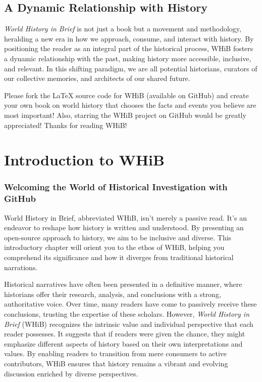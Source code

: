 \documentclass[a4paper,12pt]{book}
\begin{document}
\section*{A Dynamic Relationship with History}
\emph{World History in Brief} is not just a book but a movement and methodology, heralding a new era in how we approach, consume, and interact with history. By positioning the reader as an integral part of the historical process, WHiB fosters a dynamic relationship with the past, making history more accessible, inclusive, and relevant. In this shifting paradigm, we are all potential historians, curators of our collective memories, and architects of our shared future.

Please fork the LaTeX source code for WHiB (available on GitHub) and create your own book on world history that chooses the facts and events you believe are most important! Also, starring the WHiB project on GitHub would be greatly appreciated! Thanks for reading WHiB!

\chapter{Introduction to WHiB}
\subsection*{Welcoming the World of Historical Investigation with GitHub}
World History in Brief, abbreviated WHiB, isn't merely a passive read. It's an endeavor to reshape how history is written and understood. By presenting an open-source approach to history, we aim to be inclusive and diverse. This introductory chapter will orient you to the ethos of WHiB, helping you comprehend its significance and how it diverges from traditional historical narrations.

Historical narratives have often been presented in a definitive manner, where historians offer their research, analysis, and conclusions with a strong, authoritative voice. Over time, many readers have come to passively receive these conclusions, trusting the expertise of these scholars. However, \emph{World History in Brief} (WHiB) recognizes the intrinsic value and individual perspective that each reader possesses. It suggests that if readers were given the chance, they might emphasize different aspects of history based on their own interpretations and values. By enabling readers to transition from mere consumers to active contributors, WHiB ensures that history remains a vibrant and evolving discussion enriched by diverse perspectives.
\end{document}
